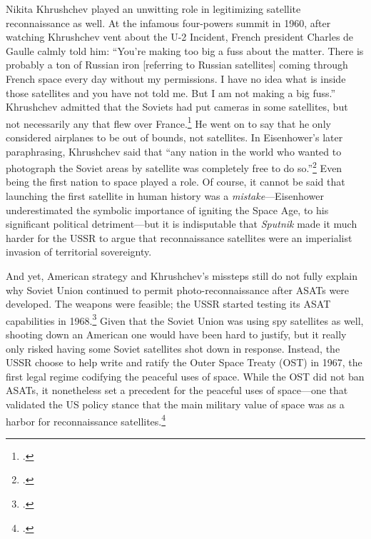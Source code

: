 \documentclass[14pt]{extarticle}
\begin{document}
Nikita Khrushchev played an unwitting role in legitimizing satellite reconnaissance as well. At the infamous four-powers summit in 1960, after watching Khrushchev vent about the U-2 Incident, French president Charles de Gaulle calmly told him: ``You're making too big a fuss about the matter. There is probably a ton of Russian iron [referring to Russian satellites] coming through French space every day without my permissions. I have no idea what is inside those satellites and you have not told me. But I am not making a big fuss.'' Khrushchev admitted that the Soviets had put cameras in some satellites, but not necessarily any that flew over France.\footcite[p.~353]{brugioni_eyes_2010} He went on to say that he only considered airplanes to be out of bounds, not satellites. In Eisenhower's later paraphrasing, Khrushchev said that ``any nation in the world who wanted to photograph the Soviet areas by satellite was completely free to do so.''\footcite[p.~556]{eisenhower_waging_1965} Even being the first nation to space played a role. Of course, it cannot be said that launching the first satellite in human history was a \emph{mistake}---Eisenhower underestimated the symbolic importance of igniting the Space Age, to his significant political detriment---but it is indisputable that \emph{Sputnik} made it much harder for the USSR to argue that reconnaissance satellites were an imperialist invasion of territorial sovereignty.

And yet, American strategy and Khrushchev's missteps still do not fully explain why Soviet Union continued to permit photo-reconnaissance after ASATs were developed. The weapons were feasible; the USSR started testing its ASAT capabilities in 1968.\footcite[p.~149]{karas_new_1983} Given that the Soviet Union was using spy satellites as well, shooting down an American one would have been hard to justify, but it really only risked having some Soviet satellites shot down in response. Instead, the USSR choose to help write and ratify the Outer Space Treaty (OST) in 1967, the first legal regime codifying the peaceful uses of space. While the OST did not ban ASATs, it nonetheless set a precedent for the peaceful uses of space---one that validated the US policy stance that the main military value of space was as a harbor for reconnaissance satellites.\footcite[p~16]{mowthorpe_militarization_2004}

\end{document}
